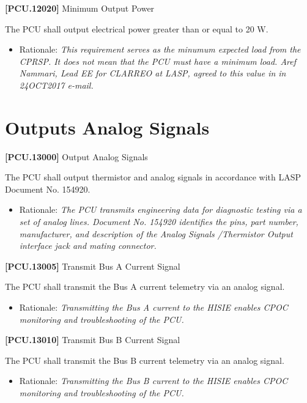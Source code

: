 \textbf{[PCU.12020]} Minimum Output Power

The \gls{PCU} shall output electrical power greater than or equal to 20 W.

\begin{itemize}
\item{} Rationale: \emph{This requirement serves as the minumum expected load from the CPRSP. It does not mean that the PCU must have a minimum load. Aref Nammari, Lead EE for CLARREO at LASP, agreed to this value in in 24OCT2017 e-mail.}

\end{itemize}

\section{Outputs Analog Signals}
\label{outputsanalogsignals}

\textbf{[PCU.13000]} Output Analog Signals

The \gls{PCU} shall output thermistor and analog signals in accordance with \gls{LASP} Document No. 154920.

\begin{itemize}
\item{} Rationale: \emph{The PCU transmits engineering data for diagnostic testing via a set of analog lines. Document No. 154920 identifies the pins, part number, manufacturer, and description of the Analog Signals \slash  Thermistor Output interface jack and mating connector.}

\end{itemize}

\textbf{[PCU.13005]} Transmit Bus A Current Signal

The \gls{PCU} shall transmit the Bus A current telemetry via an analog signal.

\begin{itemize}
\item{} Rationale: \emph{Transmitting the Bus A current to the HISIE enables CPOC monitoring and troubleshooting of the PCU.}

\end{itemize}

\textbf{[PCU.13010]} Transmit Bus B Current Signal

The \gls{PCU} shall transmit the Bus B current telemetry via an analog signal.

\begin{itemize}
\item{} Rationale: \emph{Transmitting the Bus B current to the HISIE enables CPOC monitoring and troubleshooting of the PCU.}

\end{itemize}

